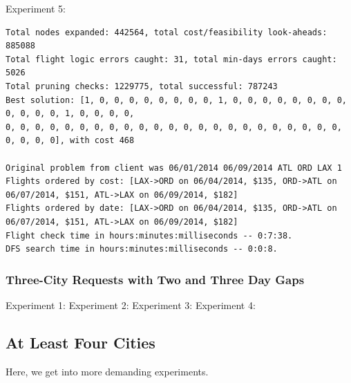 \documentclass{article}
\begin{document}
Experiment 5:

\scriptsize
\begin{verbatim}
Total nodes expanded: 442564, total cost/feasibility look-aheads: 885088
Total flight logic errors caught: 31, total min-days errors caught: 5026
Total pruning checks: 1229775, total successful: 787243
Best solution: [1, 0, 0, 0, 0, 0, 0, 0, 0, 1, 0, 0, 0, 0, 0, 0, 0, 0, 0, 0, 0, 0, 1, 0, 0, 0, 0,
0, 0, 0, 0, 0, 0, 0, 0, 0, 0, 0, 0, 0, 0, 0, 0, 0, 0, 0, 0, 0, 0, 0, 0, 0, 0, 0], with cost 468

Original problem from client was 06/01/2014 06/09/2014 ATL ORD LAX 1
Flights ordered by cost: [LAX->ORD on 06/04/2014, $135, ORD->ATL on 06/07/2014, $151, ATL->LAX on 06/09/2014, $182]
Flights ordered by date: [LAX->ORD on 06/04/2014, $135, ORD->ATL on 06/07/2014, $151, ATL->LAX on 06/09/2014, $182]
Flight check time in hours:minutes:milliseconds -- 0:7:38.
DFS search time in hours:minutes:milliseconds -- 0:0:8.
\end{verbatim}
\normalsize

\subsubsection{Three-City Requests with Two and Three Day Gaps}


Experiment 1:
Experiment 2:
Experiment 3:
Experiment 4:


\subsection{At Least Four Cities}

Here, we get into more demanding experiments.
\end{document}
